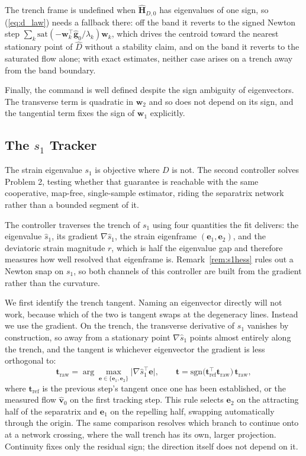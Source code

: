 \documentclass[lettersize,journal]{IEEEtran}
\begin{document}
The trench frame is undefined when $\hat{\mathbf{H}}_{D,0}$ has
eigenvalues of one sign, so (\ref{eq:d_law}) needs a fallback there:
off the band it reverts to the signed Newton step $\sum_k
\mathrm{sat}(-\mathbf{w}_k^\top\hat{\mathbf{g}}_0/\lambda_k)\mathbf{w}_k$,
which drives the centroid toward the nearest stationary point of
$\hat{D}$ without a stability claim, and on the band it reverts to the
saturated flow alone; with exact estimates, neither case arises on a
trench away from the band boundary.

Finally, the command is well defined despite the sign ambiguity of
eigenvectors. The transverse term is quadratic in $\mathbf{w}_2$ and so
does not depend on its sign, and the tangential term fixes the sign of
$\mathbf{w}_1$ explicitly.


\subsection{The $s_1$ Tracker}
\label{sec:oecs_controller}

The strain eigenvalue $s_1$ is objective where $D$ is not. The second
controller solves Problem 2, testing whether that guarantee is
reachable with the same cooperative, map-free, single-sample estimator,
riding the separatrix network rather than a bounded segment of it.

The controller traverses the trench of $s_1$ using four quantities the
fit delivers: the eigenvalue $\hat{s}_1$, its gradient
$\nabla\hat{s}_1$, the strain eigenframe $(\mathbf{e}_1, \mathbf{e}_2)$,
and the deviatoric strain magnitude $r$, which is half the eigenvalue gap
and therefore measures how well resolved that eigenframe is.
Remark~\ref{rem:s1hess} rules out a Newton snap on $s_1$, so both
channels of this controller are built from the gradient rather than the
curvature.

We first identify the trench tangent. Naming an eigenvector directly will
not work, because which of the two is tangent swaps at the degeneracy
lines. Instead we use the gradient. On the trench, the transverse
derivative of $s_1$ vanishes by construction, so away from a stationary
point $\nabla\hat{s}_1$ points almost entirely along the trench, and the
tangent is whichever eigenvector the gradient is less orthogonal to:
\begin{equation}
    \mathbf{t}_{\mathrm{raw}} =
    \arg\max_{\mathbf{e} \in \{\mathbf{e}_1, \mathbf{e}_2\}}
    \bigl\lvert \nabla\hat{s}_1^\top \mathbf{e} \bigr\rvert,
    \qquad
    \mathbf{t} = \mathrm{sgn}\bigl(\mathbf{t}_{\mathrm{ref}}^\top
    \mathbf{t}_{\mathrm{raw}}\bigr)\,\mathbf{t}_{\mathrm{raw}},
    \label{eq:tangent_select}
\end{equation}
where $\mathbf{t}_{\mathrm{ref}}$ is the previous step's tangent once one
has been established, or the measured flow $\hat{\mathbf{v}}_0$ on the
first tracking step. This rule selects $\mathbf{e}_2$ on the attracting
half of the separatrix and $\mathbf{e}_1$ on the repelling half, swapping
automatically through the origin. The same comparison resolves which
branch to continue onto at a network crossing, where the wall trench has
its own, larger projection. Continuity fixes only the residual sign; the
direction itself does not depend on it.
\end{document}
